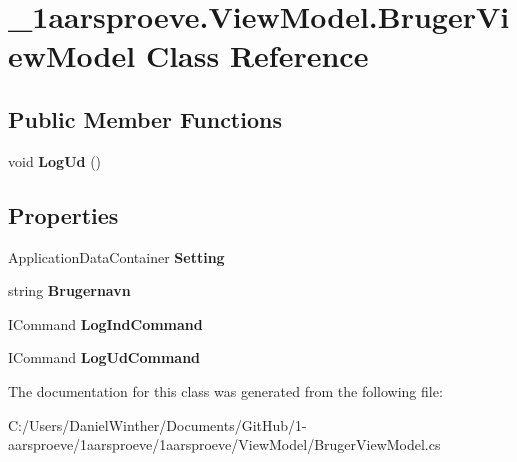 \hypertarget{class__1aarsproeve_1_1_view_model_1_1_bruger_view_model}{}\section{\+\_\+1aarsproeve.\+View\+Model.\+Bruger\+View\+Model Class Reference}
\label{class__1aarsproeve_1_1_view_model_1_1_bruger_view_model}
\subsection*{Public Member Functions}
\begin{DoxyCompactItemize}
\item 
\hypertarget{class__1aarsproeve_1_1_view_model_1_1_bruger_view_model_a8c2d6da5fad3a9bdbbde9ce986dcbc74}{}void {\bfseries Log\+Ud} ()\label{class__1aarsproeve_1_1_view_model_1_1_bruger_view_model_a8c2d6da5fad3a9bdbbde9ce986dcbc74}

\end{DoxyCompactItemize}
\subsection*{Properties}
\begin{DoxyCompactItemize}
\item 
\hypertarget{class__1aarsproeve_1_1_view_model_1_1_bruger_view_model_ac9e91065596a741027a1b88853bd76e6}{}Application\+Data\+Container {\bfseries Setting}\label{class__1aarsproeve_1_1_view_model_1_1_bruger_view_model_ac9e91065596a741027a1b88853bd76e6}

\item 
\hypertarget{class__1aarsproeve_1_1_view_model_1_1_bruger_view_model_a63b4a8aa59a8e3e2ec0d7285c2ce6caa}{}string {\bfseries Brugernavn}\label{class__1aarsproeve_1_1_view_model_1_1_bruger_view_model_a63b4a8aa59a8e3e2ec0d7285c2ce6caa}

\item 
\hypertarget{class__1aarsproeve_1_1_view_model_1_1_bruger_view_model_a40fed761861b9387bc47a92a2f1e55fd}{}I\+Command {\bfseries Log\+Ind\+Command}\label{class__1aarsproeve_1_1_view_model_1_1_bruger_view_model_a40fed761861b9387bc47a92a2f1e55fd}

\item 
\hypertarget{class__1aarsproeve_1_1_view_model_1_1_bruger_view_model_afc1d332a62edcc717d3e1764db42c89a}{}I\+Command {\bfseries Log\+Ud\+Command}\label{class__1aarsproeve_1_1_view_model_1_1_bruger_view_model_afc1d332a62edcc717d3e1764db42c89a}

\end{DoxyCompactItemize}


The documentation for this class was generated from the following file\+:\begin{DoxyCompactItemize}
\item 
C\+:/\+Users/\+Daniel\+Winther/\+Documents/\+Git\+Hub/1-\/aarsproeve/1aarsproeve/1aarsproeve/\+View\+Model/Bruger\+View\+Model.\+cs\end{DoxyCompactItemize}
